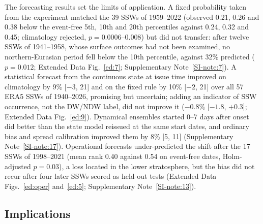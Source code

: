 \documentclass[11pt]{article}
\begin{document}
The forecasting results set the limits of application. A fixed probability taken from the experiment matched the 39 SSWs of 1959--2022 (observed 0.21, 0.26 and 0.38 below the event-free 5th, 10th and 20th percentiles against 0.24, 0.32 and 0.45; climatology rejected, $p = 0.0006$--0.008) but did not transfer: after twelve SSWs of 1941--1958, whose surface outcomes had not been examined, no northern-Eurasian period fell below the 10th percentile, against 32\% predicted ($p = 0.012$; Extended Data Fig.~\ref{ed:7}; Supplementary Note~\ref{SI-note:7}). A statistical forecast from the continuous state at issue time improved on climatology by 9\% [$-3$, 21] and on the fixed rule by 10\% [$-2$, 21] over all 57 ERA5 SSWs of 1940--2026, promising but uncertain; adding an indicator of SSW occurrence, not the DW/NDW label, did not improve it ($-0.8\%$ [$-1.8$, $+0.3$]; Extended Data Fig.~\ref{ed:9}). Dynamical ensembles started 0--7 days after onset did better than the state model reissued at the same start dates, and ordinary bias and spread calibration improved them by 8\% [5, 11] (Supplementary Note~\ref{SI-note:17}). Operational forecasts under-predicted the shift after the 17 SSWs of 1998--2021 (mean rank 0.40 against 0.54 on event-free dates, Holm-adjusted $p = 0.03$), a loss located in the lower stratosphere, but the bias did not recur after four later SSWs scored as held-out tests (Extended Data Figs.~\ref{ed:oper} and~\ref{ed:5}; Supplementary Note~\ref{SI-note:13}).

\subsection*{Implications}
\end{document}
